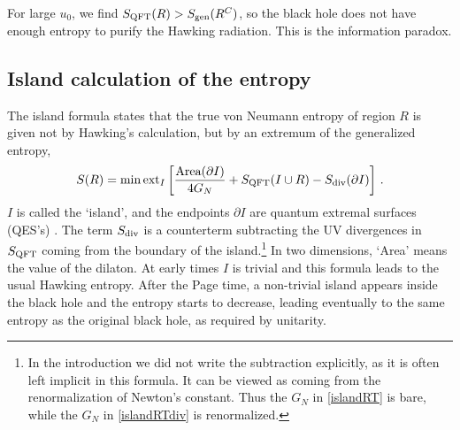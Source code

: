 \documentclass[11pt,oneside,letterpaper]{article}
\newcommand{\p}{\partial}
\newcommand{\f}{\frac}
\let\l=\lambda \let\m=\mu \let\n=\nu \let\x=\xi \let\p=\phi \let\r=v
\let\f=\frac
\def\ba{\begin{eqnarray}}
\def\ea{\end{eqnarray}}
\renewcommand{\p}{\partial}
\numberwithin{equation}{section}
\def\m{{\mu}}
\def\n{{\nu}}
\def\p{{\phi}}
\def\pp{\partial}
\def\ba{\begin{eqnarray}}
\def\ea{\end{eqnarray}}
\def\r{\rightarrow}
\def\f {\frac}
\def\l{\left}
\def\r{\right}
\def\x{\bar{x}}
\renewcommand{\p}{\partial}
\newcommand{\Smatter}{S_{\rm QFT}}
\begin{document}
\begin{spacing}{1.1}
For large $u_0$, we find $\Smatter(R) > S_{\rm gen}(R^C)$, so the black hole does not have enough entropy to purify the Hawking radiation. This is the information paradox.





\subsection{Island calculation of the entropy}
The island formula \cite{Penington:2019npb,Almheiri:2019psf,Almheiri:2019hni,Almheiri:2020cfm,Penington:2019kki} states that the true von Neumann entropy of region $R$ is given not by Hawking's calculation, but by an extremum of the generalized entropy,
  \ba\label{islandRTdiv}
 S(R)={\rm min}\, {\rm ext}_{I}\l[
 \f{\mbox{Area}(\pp{I})}{4G_N}+S_{\rm QFT}(I\cup R) - S_{\rm div}(\p I) 
 \r]\, .
 \ea
$I$ is called the `island', and the endpoints $ \p I$ are quantum extremal surfaces (QES's) \cite{Engelhardt:2014gca}.  The term $S_{\rm div}$ is a counterterm subtracting the UV divergences in $\Smatter$ coming from the boundary of the island.\footnote{In the introduction we did not write the subtraction explicitly, as it is often left implicit in this formula. It can be viewed as coming from the renormalization of Newton's constant. Thus the $G_N$ in \eqref{islandRT} is bare, while the $G_N$ in \eqref{islandRTdiv} is renormalized.}  In two dimensions, `Area' means the value of the dilaton. At early times $I$ is trivial and this formula leads to the usual Hawking entropy. After the Page time, a non-trivial island appears inside the black hole and the entropy starts to decrease, leading eventually to the same entropy as the original black hole, as required by unitarity.


\end{spacing}
\end{document}
